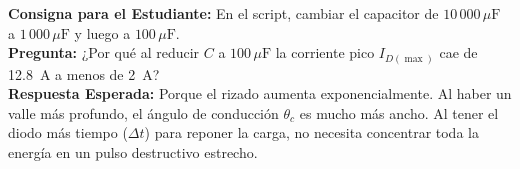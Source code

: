 \documentclass[11pt, a4paper]{article}
\begin{document}
\begin{aviso}
\textbf{Consigna para el Estudiante:} En el script, cambiar el capacitor de $10\,000\,\mu\text{F}$ a $1\,000\,\mu\text{F}$ y luego a $100\,\mu\text{F}$. \\
\textbf{Pregunta:} ¿Por qué al reducir $C$ a $100\,\mu\text{F}$ la corriente pico $I_{D(\max)}$ cae de \qty{12.8}{\ampere} a menos de \qty{2}{\ampere}? \\
\textbf{Respuesta Esperada:} Porque el rizado aumenta exponencialmente. Al haber un valle más profundo, el ángulo de conducción $\theta_c$ es mucho más ancho. Al tener el diodo más tiempo ($\Delta t$) para reponer la carga, no necesita concentrar toda la energía en un pulso destructivo estrecho.
\end{aviso}
\end{document}
